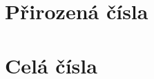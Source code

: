 \chapter{Přirozená čísla}
\label{chap:prirozena-cisla}


\chapter{Celá čísla}
\label{chap:cela-cisla}

